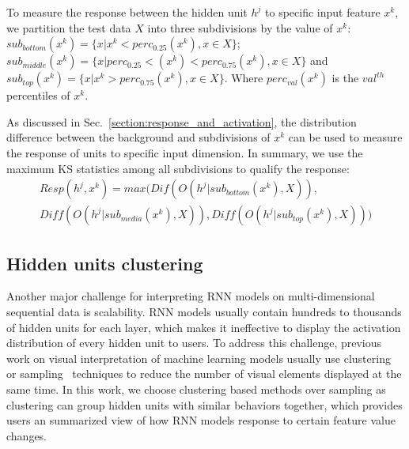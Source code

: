 To measure the response between the hidden unit $h^j$ to specific input feature $x^k$, we partition the test data $X$ into three subdivisions by the value of $x^k$: $sub_{bottom}(x^k) = \{x |x^k < perc_{0.25}(x^k), x \in X \}$;$sub_{middle}(x^k) = \{x |perc_{0.25} < (x^k) < perc_{0.75}(x^k), x \in X \}$ and $sub_{top}(x^k) = \{x |x^k > perc_{0.75}(x^k), x \in X \}$. Where $perc_{val}(x^k)$ is the $val^{th}$ percentiles of $x^k$.

As discussed in Sec.~\ref{section:response_and_activation}, the distribution difference between the background and subdivisions of $x^k$ can be used to measure the response of units to specific input dimension. In summary, we use the maximum KS statistics among all subdivisions to qualify the response:
\begin{equation}
    \label{equation:qualify_response}
    \begin{multlined}
    Resp(h^j, x^k) = max(Dif(O(h^j|sub_{bottom}(x^k), X)), \\ 
    Diff(O(h^j|sub_{media}(x^k), X)), 
    Diff(O(h^j|sub_{top}(x^k), X)))
    \end{multlined}
\end{equation}




\subsection{Hidden units clustering} \label{section:clustering}
Another major challenge for interpreting RNN models on multi-dimensional sequential data is scalability.
RNN models usually contain hundreds to thousands of hidden units for each layer, which makes it ineffective to display the activation distribution of every hidden unit to users.
To address this challenge, previous work on visual interpretation of machine learning models usually use clustering~\cite{ming2017understanding, liu2017towards} or sampling~\cite{pezzotti2018deepeyes} techniques to reduce the number of visual elements displayed at the same time.
In this work, we choose clustering based methods over sampling as clustering can group hidden units with similar behaviors together, which provides users an summarized view of how RNN models response to certain feature value changes.

